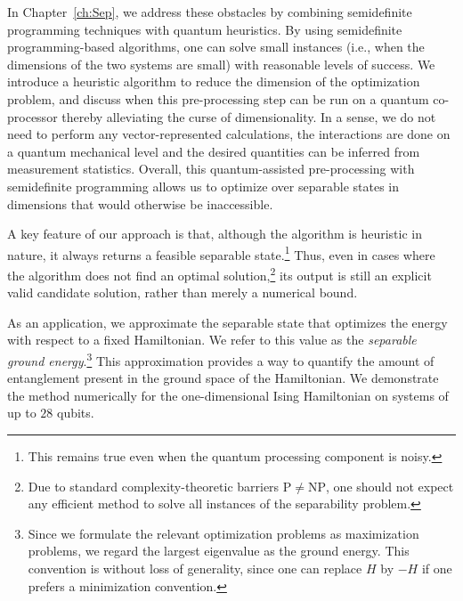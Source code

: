 In Chapter~\ref{ch:Sep}, we address these obstacles by combining semidefinite programming techniques with quantum heuristics. 
By using semidefinite programming-based algorithms, one can solve small instances (i.e., when the dimensions of the two systems are small) with reasonable levels of success. 
We introduce a heuristic algorithm to reduce the dimension of the optimization problem, and discuss when this pre-processing step can be run on a quantum co-processor thereby alleviating the curse of dimensionality. 
In a sense, we do not need to perform any vector-represented calculations, the interactions are done on a quantum mechanical level and the desired quantities can be inferred from measurement statistics. 
Overall, this quantum-assisted pre-processing with semidefinite programming allows us to optimize over separable states in dimensions that would otherwise be inaccessible.

A key feature of our approach is that, although the algorithm is heuristic in nature, it always returns a feasible separable state.\footnote{This remains true even when the quantum processing component is noisy.} 
Thus, even in cases where the algorithm does not find an optimal solution,\footnote{Due to standard complexity-theoretic barriers $\mathrm{P} \neq \mathrm{NP}$, one should not expect any efficient method to solve all instances of the separability problem.} its output is still an explicit valid candidate solution, rather than merely a numerical bound.

As an application, we approximate the separable state that optimizes the energy with respect to a fixed Hamiltonian. 
We refer to this value as the \emph{separable ground energy}.\footnote{Since we formulate the relevant optimization problems as maximization problems, we regard the largest eigenvalue as the ground energy. This convention is without loss of generality, since one can replace $H$ by $-H$ if one prefers a minimization convention.} 
This approximation provides a way to quantify the amount of entanglement present in the ground space of the Hamiltonian. 
We demonstrate the method numerically for the one-dimensional Ising Hamiltonian on systems of up to $28$ qubits.

